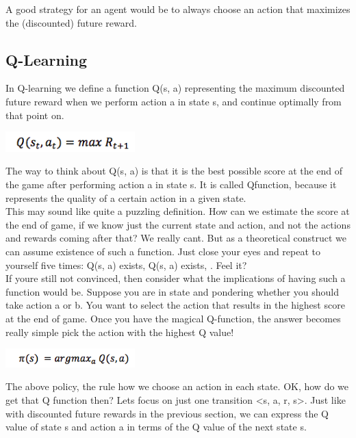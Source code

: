 \documentclass[twoside,letterpaper]{article}
\begin{document}
{{A good strategy for an agent would be to always choose an action that maximizes the (discounted) future reward.
}

\subsection[Q-Learning]{\rmfamily\bfseries\color{black}
Q-Learning}
{\color{black}
In Q-learning we define a function Q(s, a) representing the maximum discounted future reward when we perform action a in state s, and continue optimally from that point on.\\
\begin{centering}
\includegraphics[width=5cm]{images/q.png}\\
\end{centering}
The way to think about Q(s, a) is that it is the best possible score at the end of the game after performing action a in state s. It is called Qfunction, because it represents the quality of a certain action in a given state.\\

This may sound like quite a puzzling definition. How can we estimate the score at the end of game, if we know just the current state and action, and not the actions and rewards coming after that? We really cant. But as a theoretical construct we can assume existence of such a function. Just close your eyes and repeat to yourself five times: Q(s, a) exists, Q(s, a) exists, . Feel it?\\

If youre still not convinced, then consider what the implications of having such a function would be. Suppose you are in state and pondering whether you should take action a or b. You want to select the action that results in the highest score at the end of game. Once you have the magical Q-function, the answer becomes really simple pick the action with the highest Q value!

\begin{centering}
\includegraphics[width=5cm]{images/q2.png}\\
\end{centering}

The above policy, the rule how we choose an action in each state.
OK, how do we get that Q function then? Lets focus on just one transition <s, a, r, s>. Just like with discounted future rewards in the previous section, we can express the Q value of state s and action a in terms of the Q value of the next state s.

}}
\end{document}
